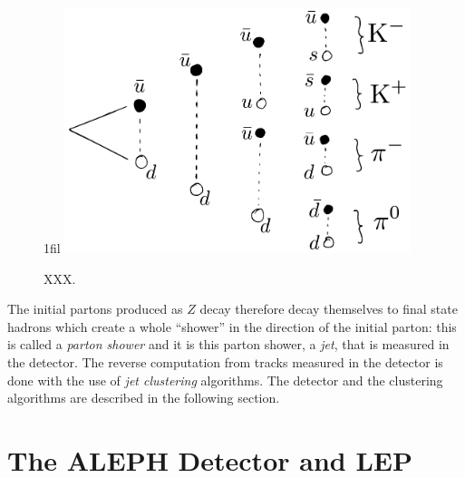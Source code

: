 \documentclass[a4paper, twoside, nobib]{tufte-book}
\makeatletter
\newcommand*{\centerfloat}{%
  \parindent \z@
  \leftskip \z@ \@plus 1fil \@minus \textwidth
  \rightskip\leftskip
  \parfillskip \z@skip}
\newcommand{\q}[1]{``#1''}
\makeatother
\begin{document}
\begin{figure}
  \centerfloat
  \includegraphics[width=0.9\textwidth]{figures/hadronization/hadronization2.pdf}
  \caption[Hadronization process]{XXX.}
  \label{fig:hep:hadronization}
\end{figure}

The initial partons produced as $Z$ decay therefore decay themselves to final state hadrons which create a whole \q{shower} in the direction of the initial parton: this is called a \emph{parton shower} and it is this parton shower, a \emph{jet}, that is measured in the detector. The reverse computation from tracks measured in the detector is done with the use of \emph{jet clustering} algorithms. The detector and the clustering algorithms are described in the following section.





\FloatBarrier
\section{The ALEPH Detector and LEP}
\label{sec:hep:aleph}







\end{document}

